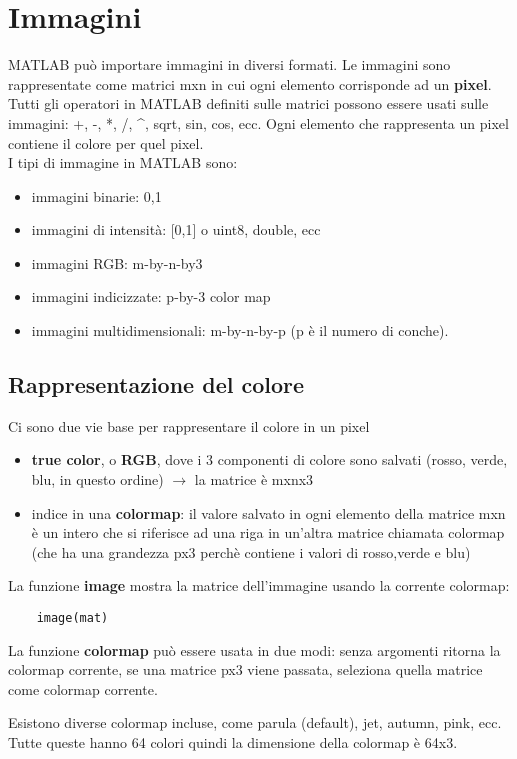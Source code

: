 \documentclass[a4paper, 10pt]{article}
\begin{document}
\section{Immagini}
MATLAB può importare immagini in diversi formati.
Le immagini sono rappresentate come matrici mxn in cui ogni elemento corrisponde ad un \textbf{pixel}. Tutti gli operatori in MATLAB definiti sulle matrici possono essere usati sulle immagini: +, -, *, /, \textasciicircum , sqrt, sin, cos, ecc.
Ogni elemento che rappresenta un pixel contiene il colore per quel pixel.\\
I tipi di immagine in MATLAB sono:
\begin{itemize}
\item immagini binarie: {0,1}
\item immagini di intensità: [0,1] o uint8, double, ecc
\item immagini RGB: m-by-n-by3
\item immagini indicizzate: p-by-3 color map
\item immagini multidimensionali: m-by-n-by-p (p è il numero di conche).
\end{itemize}

\subsection{Rappresentazione del colore}
Ci sono due vie base per rappresentare il colore in un pixel
\begin{itemize}
\item \textbf{true color}, o \textbf{RGB}, dove i 3 componenti di colore sono salvati (rosso, verde, blu, in questo ordine) $\rightarrow$ la matrice è mxnx3
\item indice in una \textbf{colormap}: il valore salvato in ogni elemento della matrice mxn è un intero che si riferisce ad una riga in un'altra matrice chiamata colormap (che ha una grandezza px3 perchè contiene i valori di rosso,verde e blu)
\end{itemize}
La funzione \textbf{image} mostra la matrice dell'immagine usando la corrente colormap:
\begin{lstlisting}
	image(mat)
\end{lstlisting}
La funzione \textbf{colormap} può essere usata in due modi: senza argomenti ritorna la colormap corrente, se una matrice px3 viene passata, seleziona quella matrice come colormap corrente.

Esistono diverse colormap incluse, come parula (default), jet, autumn, pink, ecc. Tutte queste hanno 64 colori quindi la dimensione della colormap è 64x3.
\end{document}
